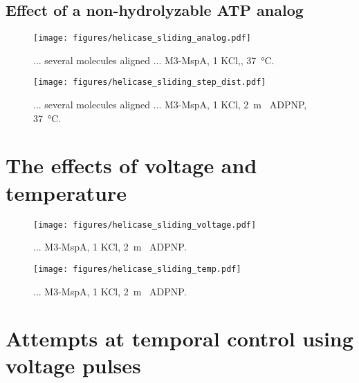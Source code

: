 \subsection{Effect of a non-hydrolyzable ATP analog}

\begin{figure}[h]
\begin{centering}
\texttt{[image: figures/helicase\_sliding\_analog.pdf]}
\caption[Unzipping time due to force depends on ATP analog]{... several molecules aligned ... M3-MspA, \SI{1}{\Molar} KCl,, \SI{37}{\celsius}.}
\label{fig:helicase_sliding_analog}
\end{centering}
\end{figure}

\begin{figure}[h]
\begin{centering}
\texttt{[image: figures/helicase\_sliding\_step\_dist.pdf]}
\caption[Distribution of step durations using mechanical force]{... several molecules aligned ... M3-MspA, \SI{1}{\Molar} KCl, \SI{2}{\m\Molar} ADPNP, \SI{37}{\celsius}.}
\label{fig:helicase_sliding_time_dist}
\end{centering}
\end{figure}

\section{The effects of voltage and temperature}

\begin{figure}[h]
\begin{centering}
\texttt{[image: figures/helicase\_sliding\_voltage.pdf]}
\caption[Forced helicase stepping depends on voltage]{...  M3-MspA, \SI{1}{\Molar} KCl, \SI{2}{\m\Molar} ADPNP.}
\label{fig:helicase_stepping_voltage}
\end{centering}
\end{figure}

\begin{figure}[h]
\begin{centering}
\texttt{[image: figures/helicase\_sliding\_temp.pdf]}
\caption[Forced helicase stepping depends on temperature]{...  M3-MspA, \SI{1}{\Molar} KCl, \SI{2}{\m\Molar} ADPNP.}
\label{fig:helicase_stepping_temp}
\end{centering}
\end{figure}


\section{Attempts at temporal control using voltage pulses}

